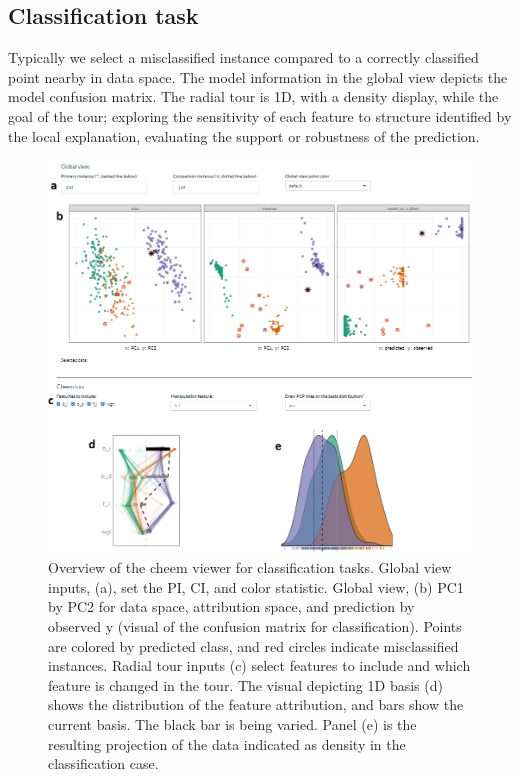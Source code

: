 \documentclass[
]{article}
\begin{document}
\hypertarget{classification-task}{%
\subsection{Classification task}\label{classification-task}}

Typically we select a misclassified instance compared to a correctly classified point nearby in data space. The model information in the global view depicts the model confusion matrix. The radial tour is 1D, with a density display, while the goal of the tour; exploring the sensitivity of each feature to structure identified by the local explanation, evaluating the support or robustness of the prediction.

\begin{figure}

{\centering \includegraphics[width=1\linewidth]{./figures/app_classification} 

}

\caption{Overview of the cheem viewer for classification tasks. Global view inputs, (a), set the PI, CI, and color statistic. Global view, (b) PC1 by PC2 for data space, attribution space, and prediction by observed y (visual of the confusion matrix for classification). Points are colored by predicted class, and red circles indicate misclassified instances. Radial tour inputs (c) select features to include and which feature is changed in the tour. The visual depicting 1D basis (d) shows the distribution of the feature attribution, and bars show the current basis. The black bar is being varied. Panel (e) is the resulting projection of the data indicated as density in the classification case.}\label{fig:classificationcase}
\end{figure}
\end{document}
